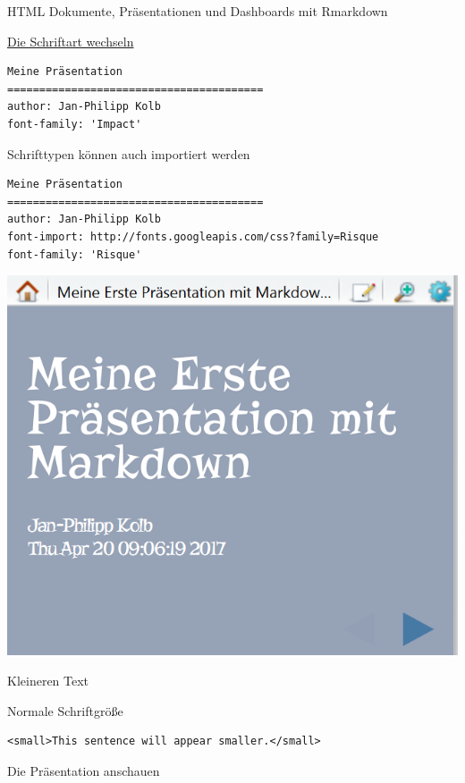 \documentclass[ignorenonframetext,]{beamer}
\begin{document}
\begin{frame}[fragile]{HTML Dokumente, Präsentationen und Dashboards mit
Rmarkdown}
\begin{block}{\href{https://support.rstudio.com/hc/en-us/articles/200532307}{Die
Schriftart wechseln}}
\begin{verbatim}
Meine Präsentation
========================================
author: Jan-Philipp Kolb
font-family: 'Impact'
\end{verbatim}

\end{block}

\begin{block}{Schrifttypen können auch importiert werden}

\begin{verbatim}
Meine Präsentation
========================================
author: Jan-Philipp Kolb
font-import: http://fonts.googleapis.com/css?family=Risque
font-family: 'Risque'
\end{verbatim}

\includegraphics{./tex2pdf.9796/5cb5d1b51d9b032cb5ac1eaeead209d94ee014d2.png}

\end{block}

\begin{block}{Kleineren Text}

Normale Schriftgröße

\begin{verbatim}
<small>This sentence will appear smaller.</small>
\end{verbatim}

\end{block}

\begin{block}{Die Präsentation anschauen}


\end{block}
\end{frame}
\end{document}
